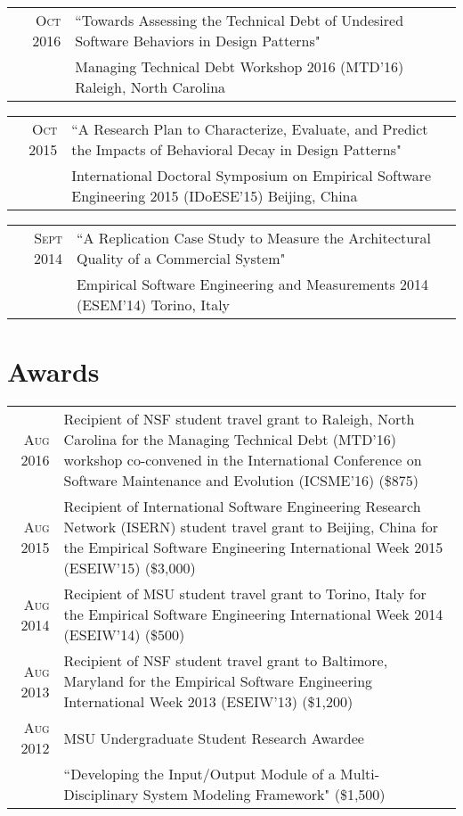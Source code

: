 \documentclass[a4paper,10pt]{article} %
\begin{document}
\begin{tabular}{rp{12.5cm}}
	\textsc{Oct 2016} & ``Towards Assessing the Technical Debt of Undesired Software Behaviors in Design Patterns"\\
	& Managing Technical Debt Workshop 2016 (MTD'16) Raleigh, North Carolina\\
\end{tabular}

\begin{tabular}{rp{12.5cm}}
	\textsc{Oct 2015} & ``A Research Plan to Characterize, Evaluate, and Predict the Impacts of Behavioral Decay in Design Patterns"\\
	& International Doctoral Symposium on Empirical Software Engineering 2015 (IDoESE'15) Beijing, China\\
\end{tabular}

\begin{tabular}{rp{12.5cm}}
	\textsc{Sept 2014} & ``A Replication Case Study to Measure the Architectural Quality of a Commercial System"\\
	& Empirical Software Engineering and Measurements 2014 (ESEM'14) Torino, Italy\\
\end{tabular}


\section{Awards}

\begin{tabular}{rp{12.5cm}}
\textsc{Aug 2016} & Recipient of NSF student travel grant to Raleigh, North Carolina for the Managing Technical Debt (MTD'16) workshop co-convened in the International Conference on Software Maintenance and Evolution (ICSME'16) (\$875)\\
	
\textsc{Aug 2015} & Recipient of International Software Engineering Research Network (ISERN) student travel grant to Beijing, China for the Empirical Software Engineering International Week 2015 (ESEIW'15) (\$3,000)\\

\textsc{Aug 2014} & Recipient of MSU student travel grant to Torino, Italy for the Empirical Software Engineering International Week 2014 (ESEIW'14) (\$500)\\

\textsc{Aug 2013} & Recipient of NSF student travel grant to Baltimore, Maryland for the Empirical Software Engineering International Week 2013 (ESEIW'13) (\$1,200)\\

\textsc{Aug 2012} & MSU Undergraduate Student Research Awardee\\
 & ``Developing the Input/Output Module of a Multi-Disciplinary System Modeling Framework"  (\$1,500)\\

\end{tabular}
\end{document}
